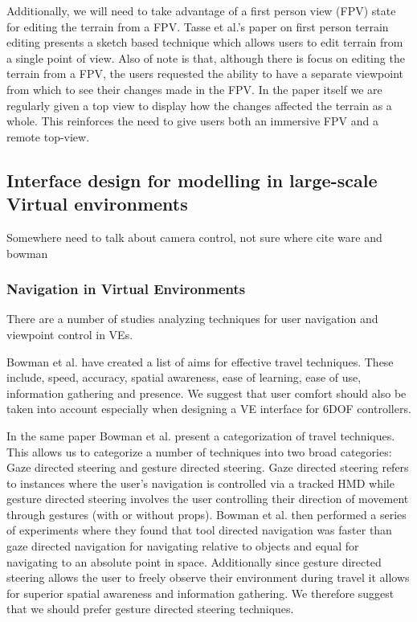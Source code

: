 \documentclass{sig-alternate-05-2015}
\begin{document}
Additionally, we will need to take advantage of a first person view (FPV) state for editing the terrain from a FPV. Tasse et al.'s paper on first person terrain editing presents a sketch based technique which allows users to  edit terrain from a single point of view\cite{Tasse2014}. Also of note is that, although there is focus on editing the terrain from a FPV, the users requested the ability to have a separate viewpoint from which to see their changes made in the FPV. In the paper itself we are regularly given a top view to display how the changes affected the terrain as a whole. This reinforces the need to give users both an immersive FPV and a remote top-view.
\subsection{Interface design for modelling in large-scale Virtual environments}
Somewhere need to talk about camera control, not sure where cite ware and bowman
\subsubsection{Navigation in Virtual Environments}
There are a number of studies analyzing techniques for user navigation and viewpoint control in VEs.

Bowman et al. have created a list of aims for effective travel techniques.\cite{Bowman1997} These include, speed, accuracy, spatial awareness, ease of learning, ease of use, information gathering and presence. We suggest that user comfort should also be taken into account especially when designing a VE interface for 6DOF controllers.

 In the same paper Bowman et al. present a categorization of travel techniques\cite{Bowman1997}. This allows us to categorize a number of techniques into two broad categories: Gaze directed steering and gesture directed steering. Gaze directed steering refers to instances where the user's navigation is controlled via a tracked HMD while gesture directed  steering involves the user controlling their direction of movement through gestures (with or without props). Bowman et al. then performed a series of experiments where they found that tool directed navigation was faster than gaze directed navigation for navigating relative to objects and equal for navigating to an absolute point in space. Additionally since gesture directed steering allows the user to freely observe their environment during travel it allows for superior spatial awareness and information gathering. We therefore suggest that we should prefer gesture directed steering techniques.
\end{document}
